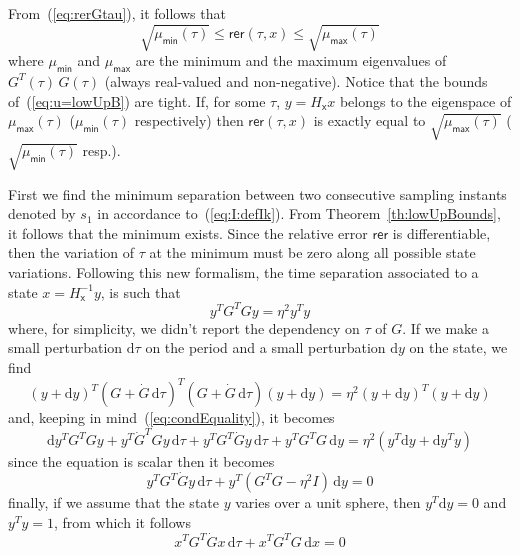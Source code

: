 \documentclass[12pt,draftcls,onecolumn]{IEEEtran} %
\newcommand{\ud}{\mathrm{d}}
\begin{document}
From~(\ref{eq:rerGtau}), it follows that
\begin{equation}
  \label{eq:u=lowUpB}
  \sqrt{\mu_\mathsf{min}(\tau)}\leq\mathsf{rer}(\tau,x)\leq
  \sqrt{\mu_\mathsf{max}(\tau)}
\end{equation}
where $\mu_\mathsf{min}$ and $\mu_\mathsf{max}$ are the minimum and
the maximum eigenvalues of $G^T\!(\tau)\,G(\tau)$ (always real-valued
and non-negative). Notice that the bounds of~(\ref{eq:u=lowUpB}) are
tight. If, for some $\tau$, $y=H_\mathsf{x}x$ belongs to the
eigenspace of $\mu_\mathsf{max}(\tau)$ ($\mu_\mathsf{min}(\tau)$
respectively) then $\mathsf{rer}(\tau,x)$ is exactly equal to
$\sqrt{\mu_\mathsf{max}(\tau)}$ ($\sqrt{\mu_\mathsf{min}(\tau)}$
resp.).

First we find the minimum separation between two consecutive sampling
instants denoted by $s_1$ in accordance to~(\ref{eq:I:defIk}). From
Theorem~\ref{th:lowUpBounds}, it follows that the minimum exists.
Since the relative error $\mathsf{rer}$ is differentiable, then the
variation of $\tau$ at the minimum must be zero along all possible
state variations. Following this new formalism, the time separation
associated to a state $x=H_\mathsf{x}^{-1}y$, is such that
\begin{equation}
  y^TG^TGy=\eta^2y^Ty
  \label{eq:condEquality}
\end{equation}
where, for simplicity, we didn't report the dependency on $\tau$ of
$G$.  If we make a small perturbation $\ud \tau$ on the period and a
small perturbation $\ud y$ on the state, we find
\begin{equation*}
  (y+\ud y)^T(G+\dot G\,\ud\tau)^T(G+\dot G\,\ud\tau)(y+\ud y)
  =\eta^2(y+\ud y)^T(y+\ud y)
\end{equation*}
and, keeping in mind~(\ref{eq:condEquality}), it becomes
\begin{equation*}
  \ud y^TG^TGy+y^T\dot G^TGy\,\ud\tau +y^TG^T\dot Gy\,\ud\tau+
  y^TG^TG\,\ud y 
  =\eta^2(y^T\ud y+\ud y^T y)
\end{equation*}
since the equation is scalar then it becomes
\begin{equation}
  y^TG^T\dot Gy\,\ud\tau+ y^T(G^TG-\eta^2I)\,\ud y=0
  \label{eq:variationXtau}
\end{equation}
finally, if we assume that the state $y$ varies over a unit sphere,
then $y^T \ud y =0$ and $y^Ty=1$, from which it follows
\begin{equation}
  x^TG^T\dot Gx\,\ud\tau+ x^TG^TG\,\ud x=0
  \label{eq:variationXtauOnSphere}
\end{equation}
\end{document}
